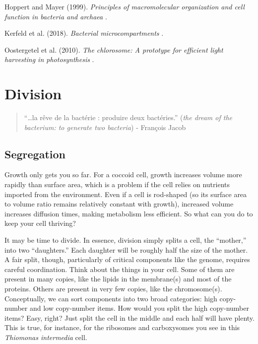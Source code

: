 \documentclass[]{tufte-book}
\begin{document}
Hoppert and Mayer (1999). \emph{Principles of macromolecular organization and cell function in bacteria and archaea} \citep{hoppert1999}.

Kerfeld et al. (2018). \emph{Bacterial microcompartments} \citep{kerfeld2018}.

Oostergetel et al. (2010). \emph{The chlorosome: A prototype for efficient light harvesting in photosynthesis} \citep{oostergetel2010}.

\hypertarget{division}{%
\chapter{Division}\label{division}}

\begin{quote}
``\ldots{}la rêve de la bactérie : produire deux bactéries.'' (\emph{the dream of the bacterium: to generate two bacteria})
- François Jacob \citep{jacob2002a}
\end{quote}

\hypertarget{segregation}{%
\section{Segregation}\label{segregation}}

Growth only gets you so far. For a coccoid cell, growth increases volume more rapidly than surface area, which is a problem if the cell relies on nutrients imported from the environment. Even if a cell is rod-shaped (so its surface area to volume ratio remains relatively constant with growth), increased volume increases diffusion times, making metabolism less efficient. So what can you do to keep your cell thriving?

It may be time to divide. In essence, division simply splits a cell, the ``mother,'' into two ``daughters.'' Each daughter will be roughly half the size of the mother. A fair split, though, particularly of critical components like the genome, requires careful coordination. Think about the things in your cell. Some of them are present in many copies, like the lipids in the membrane(s) and most of the proteins. Others are present in very few copies, like the chromosome(s). Conceptually, we can sort components into two broad categories: high copy-number and low copy-number items. How would you split the high copy-number items? Easy, right? Just split the cell in the middle and each half will have plenty. This is true, for instance, for the ribosomes and carboxysomes you see in this \emph{Thiomonas intermedia} cell.
\end{document}

